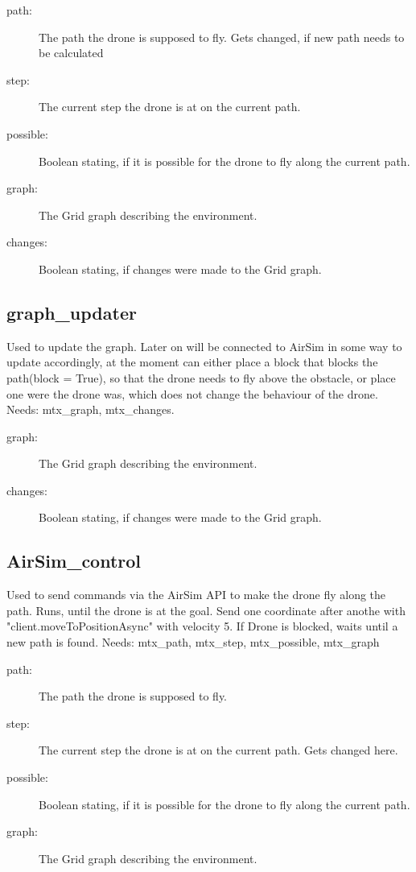 \documentclass{article}
\begin{document}
\begin{description}
    \item[path:] The path the drone is supposed to fly. Gets changed, if new path needs to be calculated
    \item[step:] The current step the drone is at on the current path.
    \item[possible:] Boolean stating, if it is possible for the drone to fly along the current path.
    \item[graph:] The Grid graph describing the environment.
    \item[changes:] Boolean stating, if changes were made to the Grid graph.
\end{description}

\subsection{graph\_updater}
Used to update the graph. Later on will be connected to AirSim in some way to update accordingly, at the moment can either place a block that blocks the path(block = True), so that the drone needs to fly above the obstacle, or place one were the drone was, which does not change the behaviour of the drone. Needs: mtx\_graph, mtx\_changes.

\begin{description}
    \item[graph:] The Grid graph describing the environment.
    \item[changes:] Boolean stating, if changes were made to the Grid graph.
\end{description}

\subsection{AirSim\_control}
Used to send commands via the AirSim API to make the drone fly along the path. Runs, until the drone is at the goal. Send one coordinate after anothe with "client.moveToPositionAsync" with velocity 5. If Drone is blocked, waits until a new path is found. Needs: mtx\_path, mtx\_step, mtx\_possible, mtx\_graph

\begin{description}
    \item[path:] The path the drone is supposed to fly.
    \item[step:] The current step the drone is at on the current path. Gets changed here.
    \item[possible:] Boolean stating, if it is possible for the drone to fly along the current path.
    \item[graph:] The Grid graph describing the environment.
\end{description}
\end{document}
